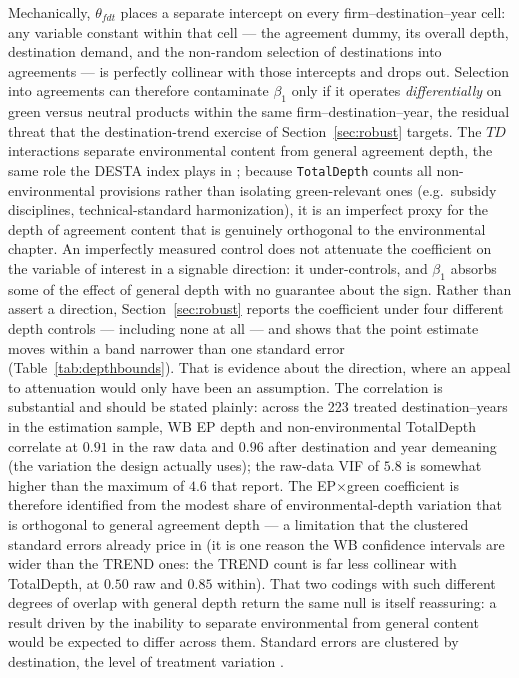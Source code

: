 \documentclass[12pt]{article}
\begin{document}
Mechanically, $\theta_{fdt}$ places a separate intercept on every firm--destination--year
cell: any variable constant within that cell --- the agreement dummy, its overall depth,
destination demand, and the non-random selection of destinations into agreements --- is
perfectly collinear with those intercepts and drops out. Selection into agreements can
therefore contaminate $\beta_1$ only if it operates \emph{differentially} on green versus
neutral products within the same firm--destination--year, the residual threat that the
destination-trend exercise of Section~\ref{sec:robust} targets.
The $TD$ interactions separate environmental content from general agreement depth, the
same role the DESTA index \citep{dur2014} plays in \citet{brandi2020}; because
\texttt{TotalDepth} counts all non-environmental provisions rather than isolating
green-relevant ones (e.g.\ subsidy disciplines, technical-standard harmonization), it is
an imperfect proxy for the depth of agreement content that is genuinely orthogonal to
the environmental chapter. An imperfectly measured control does not attenuate the
coefficient on the variable of interest in a signable direction: it under-controls, and
$\beta_1$ absorbs some of the effect of general depth with no guarantee about the sign.
Rather than assert a direction, Section~\ref{sec:robust} reports the coefficient under
four different depth controls --- including none at all --- and shows that the point
estimate moves within a band narrower than one standard error
(Table~\ref{tab:depthbounds}). That is evidence about the direction, where an appeal to
attenuation would only have been an assumption. The correlation is substantial and
should be stated plainly: across the 223 treated destination--years in the estimation
sample, WB EP depth and non-environmental TotalDepth correlate at $0.91$ in the raw data
and $0.96$ after destination and year demeaning (the variation the design actually
uses); the raw-data VIF of $5.8$ is somewhat higher than the maximum of $4.6$ that
\citet{brandi2020} report. The EP$\times$green coefficient is therefore identified from
the modest share of environmental-depth variation that is orthogonal to general
agreement depth --- a limitation that the clustered standard errors already price in
(it is one reason the WB confidence intervals are wider than the TREND ones: the TREND
count is far less collinear with TotalDepth, at $0.50$ raw and $0.85$ within). That two
codings with such different degrees of overlap with general depth return the same null
is itself reassuring: a result driven by the inability to separate environmental from
general content would be expected to differ across them. Standard errors are clustered
by destination, the level of treatment variation \citep{abadie2023}.
\end{document}
